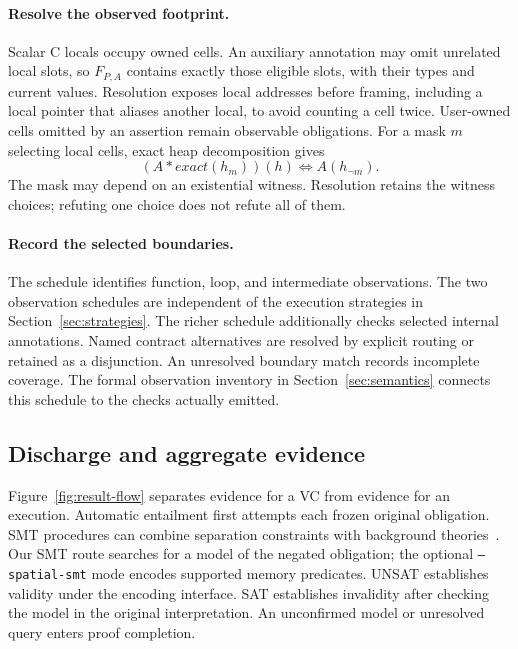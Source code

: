 

\paragraph{Resolve the observed footprint.}
Scalar C locals occupy owned cells. An auxiliary annotation may omit
unrelated local slots, so $F_{P,A}$ contains exactly those eligible
slots, with their types and current values.
Resolution exposes local addresses before framing, including a local
pointer that aliases another local, to avoid counting a cell twice.
User-owned cells omitted by an assertion remain observable obligations.
For a mask $m$ selecting local cells, exact heap decomposition gives
\[
 (A*\mathit{exact}(h_m))(h)\Longleftrightarrow A(h_{\neg m}).
\]
The mask may depend on an existential witness. Resolution retains the
witness choices; refuting one choice does not refute all of them.

\paragraph{Record the selected boundaries.}
The schedule identifies function, loop, and intermediate observations.
The two observation schedules are independent of the execution strategies
in Section~\ref{sec:strategies}. The richer schedule additionally checks
selected internal annotations.
Named contract alternatives are resolved by explicit routing or retained
as a disjunction. An unresolved boundary match records incomplete coverage.
The formal observation inventory in Section~\ref{sec:semantics} connects
this schedule to the checks actually emitted.





\subsection{Discharge and aggregate evidence}
\label{sec:evidence}
Figure~\ref{fig:result-flow} separates evidence for a VC from evidence
for an execution. Automatic entailment first attempts each frozen original
obligation. SMT procedures can combine separation constraints with
background theories~\cite{piskac2013smt,reynolds2016sl}.
Our SMT route searches for a model of the negated obligation; the optional
\texttt{--spatial-smt} mode encodes supported memory predicates.
UNSAT establishes validity under the encoding interface.
SAT establishes invalidity after checking the model in the original
interpretation. An unconfirmed model or unresolved query enters proof
completion.


